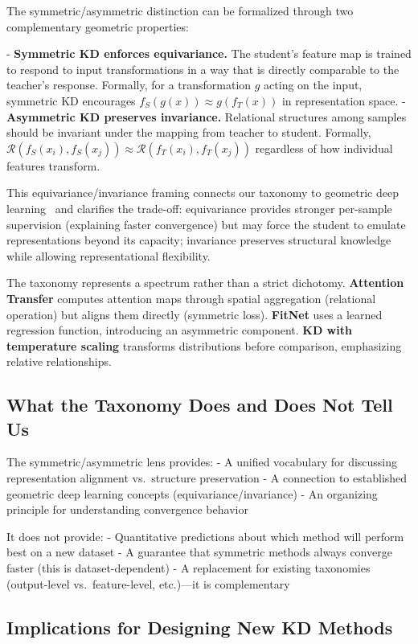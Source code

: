\documentclass[symmetry,article,submit,pdftex,moreauthors]{Definitions/mdpi}
\begin{document}
The symmetric/asymmetric distinction can be formalized through two complementary geometric properties:

- \textbf{Symmetric KD enforces equivariance.} The student's feature map is trained to respond to input transformations in a way that is directly comparable to the teacher's response. Formally, for a transformation $g$ acting on the input, symmetric KD encourages $f_S(g(x)) \approx g(f_T(x))$ in representation space.
- \textbf{Asymmetric KD preserves invariance.} Relational structures among samples should be invariant under the mapping from teacher to student. Formally, $\mathcal{R}(f_S(x_i), f_S(x_j)) \approx \mathcal{R}(f_T(x_i), f_T(x_j))$ regardless of how individual features transform.

This equivariance/invariance framing connects our taxonomy to geometric deep learning~\cite{ref14} and clarifies the trade-off: equivariance provides stronger per-sample supervision (explaining faster convergence) but may force the student to emulate representations beyond its capacity; invariance preserves structural knowledge while allowing representational flexibility.

The taxonomy represents a spectrum rather than a strict dichotomy. \textbf{Attention Transfer} computes attention maps through spatial aggregation (relational operation) but aligns them directly (symmetric loss). \textbf{FitNet} uses a learned regression function, introducing an asymmetric component. \textbf{KD with temperature scaling} transforms distributions before comparison, emphasizing relative relationships.

\subsection{What the Taxonomy Does and Does Not Tell Us}

The symmetric/asymmetric lens provides:
- A unified vocabulary for discussing representation alignment vs.\ structure preservation
- A connection to established geometric deep learning concepts (equivariance/invariance)
- An organizing principle for understanding convergence behavior

It does not provide:
- Quantitative predictions about which method will perform best on a new dataset
- A guarantee that symmetric methods always converge faster (this is dataset-dependent)
- A replacement for existing taxonomies (output-level vs.\ feature-level, etc.)---it is complementary

\subsection{Implications for Designing New KD Methods}
\end{document}
